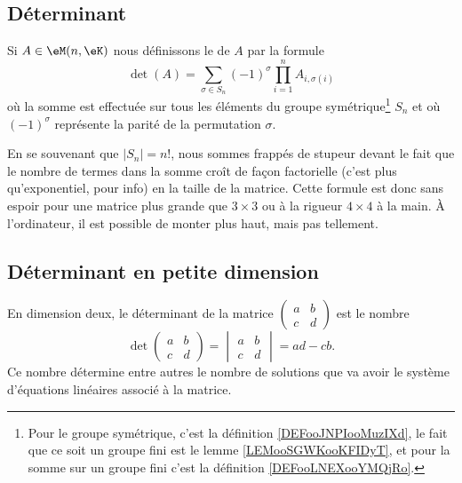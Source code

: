 \subsection{Déterminant}

\begin{definition}      \label{DEFooYCKRooTrajdP}
	Si \( A\in\eM(n,\eK)\) nous définissons le  de \( A\) par la formule
	\begin{equation}
		\det(A)=\sum_{\sigma\in S_n}(-1)^{\sigma}\prod_{i=1}^nA_{i,\sigma(i)}
	\end{equation}
	où la somme est effectuée sur tous les éléments du groupe symétrique\footnote{Pour le groupe symétrique, c'est la définition \ref{DEFooJNPIooMuzIXd}, le fait que ce soit un groupe fini est le lemme \ref{LEMooSGWKooKFIDyT}, et pour la somme sur un groupe fini c'est la définition \ref{DEFooLNEXooYMQjRo}.} \( S_n\) et où \( (-1)^{\sigma}\) représente la parité de la permutation \( \sigma\).
\end{definition}
En se souvenant que \( | S_n |=n!\), nous sommes frappés de stupeur devant le fait que le nombre de termes dans la somme croît de façon factorielle (c'est plus qu'exponentiel, pour info) en la taille de la matrice. Cette formule est donc sans espoir pour une matrice plus grande que \( 3\times 3\) ou à la rigueur \( 4\times 4\) à la main. À l'ordinateur, il est possible de monter plus haut, mais pas tellement.

\subsection{Déterminant en petite dimension}

En dimension deux, le déterminant de la matrice
\( \begin{pmatrix}
	a & b \\
	c & d
\end{pmatrix}\)
est le nombre
\begin{equation}        \label{EQooQRGVooChwRMd}
	\det\begin{pmatrix}
		a & b \\
		c & d
	\end{pmatrix}=\begin{vmatrix}
		a & b \\
		c & d
	\end{vmatrix}=ad-cb.
\end{equation}
Ce nombre détermine entre autres le nombre de solutions que va avoir le système d'équations linéaires associé à la matrice.

